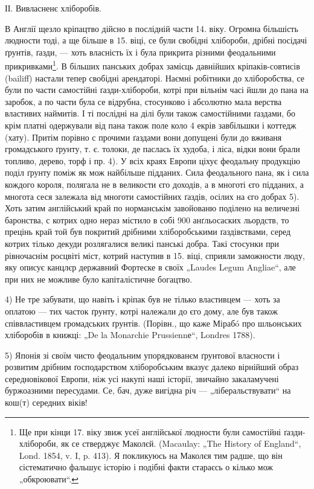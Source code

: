 ІІ. Вивласненє хліборобів.

В Англії щезло кріпацтво дійсно в послідній части 14. віку. Огромна більшість людности тоді, а ще
більше в 15. віці, се були свобідні хлібороби, дрібні посідачі ґрунтів, ґазди, — хоть власність їх і
була прикрита різними феодальними прикривками\footnote{
Ще при кінци 17. віку звиж  усеї англійської людности були самостійні ґазди-хлібороби, як се
стверджує Маколєй. (Macaulay: „The History of England“, Lond. 1854, v. I, p. 413). Я покликуюсь на
Маколєя тим радше, що він сістематично фальшує історію і подібні факти стараєсь о кілько мож
„обкроювати“.
}. В більших панських добрах замісць давнійших
кріпаків-совтисів (bailiff) настали тепер свобідні арендаторі. Наємні робітники до хліборобства, се
були по части самостійні ґазди-хлібороби, котрі при вільнім часі йшли до пана на заробок, а по части
була се відрубна, стосунково і абсолютно мала верства властивих наймитів. І ті послідні на ділі були
також самостійними ґаздами, бо крім платні одержували від пана також поле коло 4 екрів завбільшки і
коттедж (хату). Притім порівно с прочими ґаздами вони допущені були до вживаня громадського ґрунту,
т. є. толоки, де паслась їх худоба, і ліса, відки вони брали топливо, дерево, торф і пр. 4). У всіх
краях Европи ціхує феодальну продукцію поділ ґрунту поміж як мож найбільше підданих. Сила
феодального пана, як і сила кождого короля, полягала не в великости єго доходів, а в многоті єго
підданих, а многота сеся залежала від многоти самостійних ґаздів, осілих на єго добрах 5). Хоть
затим англійський край по норманськім завойованю поділено на величезні баронства, с котрих одно
нераз містило в собі 900 анґльосаских льордств, то прецінь край той був покритий дрібними
хліборобськими ґаздівствами, серед котрих тілько декуди розлягалися великі панські добра. Такі
стосунки при рівночаснім росцвіті міст, котрий наступив в 15. віці, сприяли заможности люду, яку
описує канцлєр державний Фортеске в своїх „Laudes Legum Angliae“, але при них не можливе було
капіталістичне богацтво.

4) Не тре забувати, що навіть і кріпак був не тілько властивцем — хоть за оплатою — тих часток
ґрунту, котрі належали до єго дому, але був також співвластивцем громадських ґрунтів. (Порівн., що
каже Мірабó про шльонських хліборобів в книжці: „De la Monarchie Prussiennе“, Londres 1788).

5) Японія зі своїм чисто феодальним упорядкованєм ґрунтової власности і розвитим дрібним
ґосподарством хліборобським вказує далеко вірнійший образ середновікової Европи, ніж усі накупі наші
історії, звичайно закаламучені буржоазними пересудами. Се, бач, дуже вигідна річ —
„ліберальствувати“ на кош(т) середних віків!
